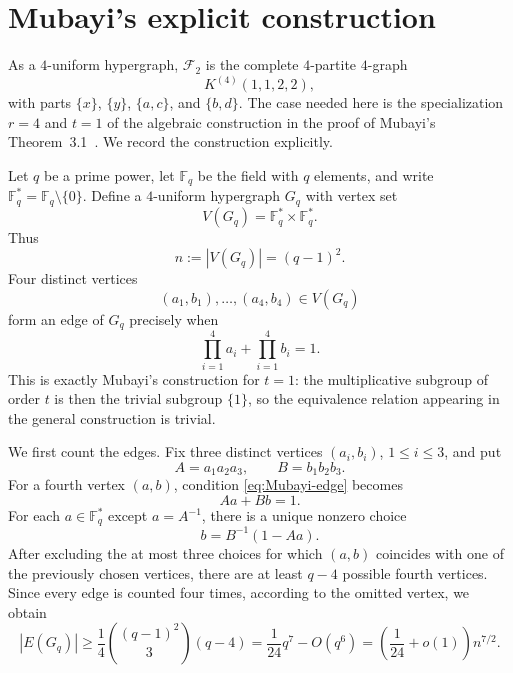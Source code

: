 \documentclass[11pt]{article}
\theoremstyle{definition}
\newcommand{\cF}{\mathcal F}
\begin{document}
	\section{Mubayi's explicit construction}
	
	As a $4$-uniform hypergraph, $\cF_2$ is the complete $4$-partite
	$4$-graph
	\[
	K^{(4)}(1,1,2,2),
	\]
	with parts $\{x\}$, $\{y\}$, $\{a,c\}$, and $\{b,d\}$. The case needed
	here is the specialization $r=4$ and $t=1$ of the algebraic construction
	in the proof of Mubayi's Theorem~3.1~\cite{MUBAYI_2002}. We record the
	construction explicitly.
	
	Let $q$ be a prime power, let $\mathbb F_q$ be the field with $q$
	elements, and write $\mathbb F_q^\ast=\mathbb F_q\setminus\{0\}$. Define
	a $4$-uniform hypergraph $G_q$ with vertex set
	\[
	V(G_q)=\mathbb F_q^\ast\times\mathbb F_q^\ast.
	\]
	Thus
	\[
	n:=|V(G_q)|=(q-1)^2.
	\]
	Four distinct vertices
	\[
	(a_1,b_1),\ldots,(a_4,b_4)\in V(G_q)
	\]
	form an edge of $G_q$ precisely when
	\begin{equation}\label{eq:Mubayi-edge}
		\prod_{i=1}^4 a_i+\prod_{i=1}^4 b_i=1.
	\end{equation}
	This is exactly Mubayi's construction for $t=1$: the multiplicative
	subgroup of order $t$ is then the trivial subgroup $\{1\}$, so the
	equivalence relation appearing in the general construction is trivial.
	
	We first count the edges. Fix three distinct vertices
	$(a_i,b_i)$, $1\le i\le 3$, and put
	\[
	A=a_1a_2a_3,\qquad B=b_1b_2b_3.
	\]
	For a fourth vertex $(a,b)$, condition \eqref{eq:Mubayi-edge} becomes
	\[
	Aa+Bb=1.
	\]
	For each $a\in\mathbb F_q^\ast$ except $a=A^{-1}$, there is a unique
	nonzero choice
	\[
	b=B^{-1}(1-Aa).
	\]
	After excluding the at most three choices for which $(a,b)$ coincides
	with one of the previously chosen vertices, there are at least $q-4$
	possible fourth vertices. Since every edge is counted four times,
	according to the omitted vertex, we obtain
	\begin{equation}\label{eq:Mubayi-count}
		|E(G_q)|
		\ge
		\frac{1}{4}\binom{(q-1)^2}{3}(q-4)
		=
		\frac{1}{24}q^7-O(q^6)
		=
		\left(\frac{1}{24}+o(1)\right)n^{7/2}.
	\end{equation}
	
\end{document}
